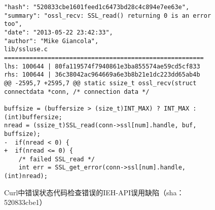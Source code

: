 \begin{figure}[b]
	\centering
\begin{lstlisting}
"hash": "520833cbe1601feed1c6473bd28c4c894e7ee63e",
"summary": "ossl_recv: SSL_read() returning 0 is an error too",
"date": "2013-05-22 23:42:33",
"author": "Mike Giancola",
lib/ssluse.c
=======================================================
lhs: 100644 | 80fa119574f7940861e3ba855574ae59cd5cf833
rhs: 100644 | 36c38042ac964669a6e3b8b21e1dc223dd65ab4b
@@ -2595,7 +2595,7 @@ static ssize_t ossl_recv(struct connectdata *conn, /* connection data */

buffsize = (buffersize > (size_t)INT_MAX) ? INT_MAX : (int)buffersize;
nread = (ssize_t)SSL_read(conn->ssl[num].handle, buf, buffsize);
-  if(nread < 0) {
+  if(nread <= 0) {
	/* failed SSL_read */
	int err = SSL_get_error(conn->ssl[num].handle, (int)nread);

\end{lstlisting}
	\caption{
	Curl中错误状态代码检查错误的IEH-API误用缺陷（sha：520833cbe1）
	}
	\label{fig:2-3-ieh-2}
\end{figure}